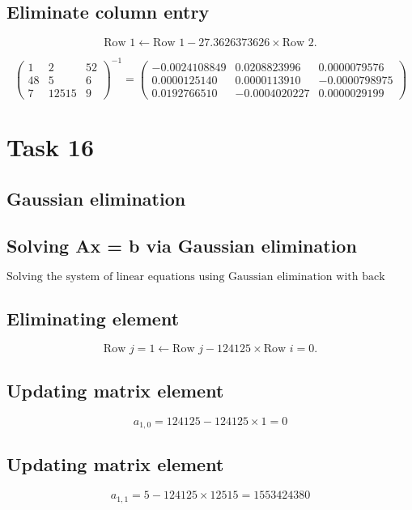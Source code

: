 \documentclass{article}
\begin{document}
\subsection*{ \vspace{1em} Eliminate column entry}
\[
\text{Row } 1 \leftarrow \text{Row }1 - 27.3626373626 \times \text{Row } 2.
\]
\medskip

\[
\begin{pmatrix}1 & 2 & 52 \\ 48 & 5 & 6 \\ 7 & 12515 & 9\end{pmatrix}^{-1} = \begin{pmatrix}-0.0024108849 & 0.0208823996 & 0.0000079576 \\ 0.0000125140 & 0.0000113910 & -0.0000798975 \\ 0.0192766510 & -0.0004020227 & 0.0000029199\end{pmatrix}
\]
\bigskip

\hrulefill
\bigskip

\section*{Task 16}

\subsection*{Gaussian elimination}
\subsection*{ \vspace{1em} Solving Ax = b via Gaussian elimination}
\[
\text{Solving the system of linear equations using Gaussian elimination with back substitution.}
\]
\subsection*{ \vspace{1em} Eliminating element}
\[
\text{Row } j = 1 \leftarrow \text{Row } j - 124125 \times \text{Row } i = 0.
\]
\subsection*{ \vspace{1em} Updating matrix element}
\[
a_{1,0} = 124125 - 124125 \times 1 = 0
\]
\subsection*{ \vspace{1em} Updating matrix element}
\[
a_{1,1} = 5 - 124125 \times 12515 = 1553424380
\]
\end{document}
